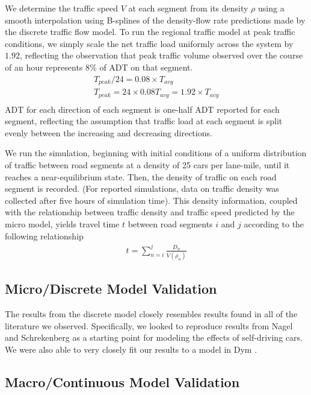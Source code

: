 We determine the traffic speed $V$ at each segment from its density $\rho$ using a smooth interpolation using B-splines of the density-flow rate predictions made by the discrete traffic flow model. To run the regional traffic model at peak traffic conditions, we simply scale the net traffic load uniformly across the system by $1.92$, reflecting the observation that peak traffic volume observed over the course of an hour represents $8\%$ of ADT on that segment.
\begin{align*}
T_{peak} / 24 = 0.08 \times T_{avg} \\
T_{peak}  = 24 \times 0.08  T_{avg} = 1.92 \times  T_{avg}   \\
\end{align*}
ADT for each direction of each segment is one-half ADT reported for each segment, reflecting the assumption that traffic load at each segment is split evenly between the increasing and decreasing directions.

We run the simulation, beginning with initial conditions of a uniform distribution of traffic between road segments at a density of 25 cars per lane-mile, until it reaches a near-equilibrium state. Then, the density of traffic on each road segment is recorded. (For reported simulations, data on traffic density was collected after five hours of simulation time). This density information, coupled with the relationship between traffic density and traffic speed predicted by the micro model, yields travel time $t$ between road segments $i$ and $j$ according to the following relationship
\begin{align*}
t = \sum_{n = i}^{j} \frac{D_n}{V(\rho_n)}
\end{align*}

\subsection{Micro/Discrete Model Validation}
The results from the discrete model closely resembles results found in all of the literature we observed\cite{KachrooTrafficFramework,Dym2004PrinciplesModeling}. Specifically, we looked to reproduce results from Nagel and Schrekenberg\cite{Nagel1992ATraffic} as a starting point for modeling the effects of self-driving cars. We were also able to very closely fit our results to a model in Dym \cite{Dym2004PrinciplesModeling}. 
\subsection{Macro/Continuous Model Validation} \label{sec:macro_validation}

